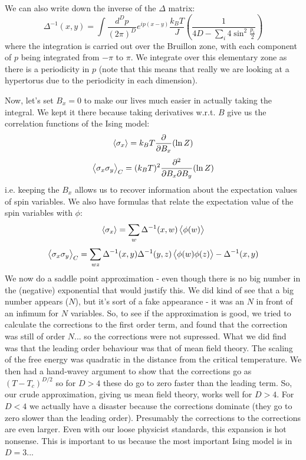 We can also write down the inverse of the $\Delta$ matrix:
\begin{equation}
    \Delta^{-1}(x, y) = \int \frac{d^Dp}{(2\pi)^D}e^{ip(x - y)}\frac{k_B T}{J}\left(\frac{1}{4D - \sum_i 4\sin^2\frac{p_i}{2}}\right)
\end{equation}
where the integration is carried out over the Bruillon zone, with each component of $p$ being integrated from $-\pi$ to $\pi$. We integrate over this elementary zone as there is a periodicity in $p$ (note that this means that really we are looking at a hypertorus due to the periodicity in each dimension). 

Now, let's set $B_x = 0$ to make our lives much easier in actually taking the integral. We kept it there because taking derivatives w.r.t. $B$ give us the correlation functions of the Ising model:
\begin{equation}
    \left< \sigma_x \right> = k_B T \frac{\partial }{\partial B_x}(\ln Z)
\end{equation}
\begin{equation}
    \left< \sigma_x\sigma_y \right>_C = (k_B T)^2\frac{\partial^2}{\partial B_x \partial B_y}(\ln Z)
\end{equation}
i.e. keeping the $B_x$ allows us to recover information about the expectation values of spin variables. We also have formulas that relate the expectation value of the spin variables with $\phi$:
\begin{equation}
    \avg{\sigma_x} = \sum_w \Delta^{-1}(x, w) \avg{\phi(w)}
\end{equation}
\begin{equation}
    \avg{\sigma_x\sigma_y}_C = \sum_{wz}\Delta^{-1}(x, y)\Delta^{-1}(y, z)\avg{\phi(w)\phi(z)} - \Delta^{-1}(x, y)
\end{equation}
We now do a saddle point approximation - even though there is no big number in the (negative) exponential that would justify this. We did kind of see that a big number appears ($N$), but it's sort of a fake appearance - it was an $N$ in front of an infimum for $N$ variables. So, to see if the approximation is good, we tried to calculate the corrections to the first order term, and found that the correction was still of order $N$... so the corrections were not supressed. What we did find was that the leading order behaviour was that of mean field theory. The scaling of the free energy was quadratic in the distance from the critical temperature. We then had a hand-wavey argument to show that the corrections go as $(T - T_c)^{D/2}$ so for $D > 4$ these do go to zero faster than the leading term. So, our crude approximation, giving us mean field theory, works well for $D > 4$. For $D < 4$ we actually have a disaster because the corrections dominate (they go to zero slower than the leading order). Presumably the corrections to the corrections are even larger. Even with our loose physicist standards, this expansion is hot nonsense. This is important to us because the most important Ising model is in $D = 3$... 

